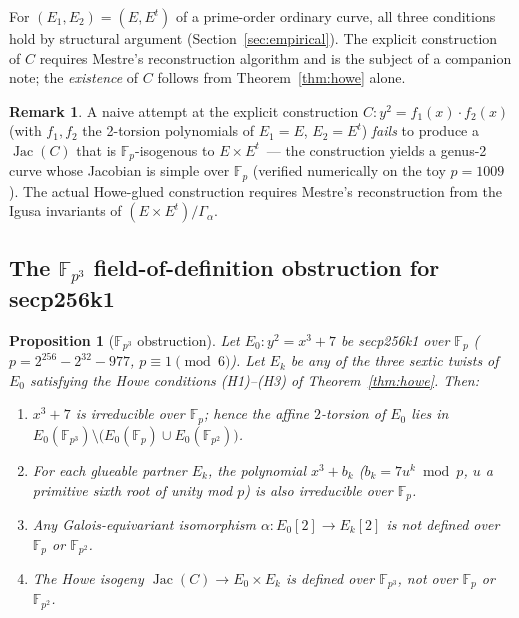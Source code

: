 \documentclass[11pt,a4paper]{article}
\newtheorem{proposition}[theorem]{Proposition}
\theoremstyle{definition}
\newtheorem{remark}[theorem]{Remark}
\newcommand{\FF}{\mathbb{F}}
\newcommand{\Jac}{\operatorname{Jac}}
\begin{document}
For $(E_1, E_2) = (E, E^t)$ of a prime-order ordinary curve, all
three conditions hold by structural argument
(Section~\ref{sec:empirical}). The explicit construction of $C$
requires Mestre's reconstruction algorithm and is the subject of a
companion note; the \emph{existence} of $C$ follows from
Theorem~\ref{thm:howe} alone.

\begin{remark}
A naive attempt at the explicit construction
$C\colon y^2 = f_1(x) \cdot f_2(x)$ (with $f_1, f_2$ the 2-torsion
polynomials of $E_1 = E$, $E_2 = E^t$) \emph{fails} to produce a
$\Jac(C)$ that is $\FF_p$-isogenous to $E \times E^t$~--- the
construction yields a genus-2 curve whose Jacobian is simple over
$\FF_p$ (verified numerically on the toy $p = 1009$). The actual
Howe-glued construction requires Mestre's reconstruction from the
Igusa invariants of $(E \times E^t)/\Gamma_\alpha$.
\end{remark}

\subsection*{The $\FF_{p^3}$ field-of-definition obstruction for secp256k1}

\begin{proposition}[$\FF_{p^3}$ obstruction]\label{prop:fp3obs}
Let $E_0\colon y^2 = x^3 + 7$ be secp256k1 over $\FF_p$
\textup{(}$p = 2^{256} - 2^{32} - 977$, $p \equiv 1 \pmod 6$\textup{)}.
Let $E_k$ be any of the three sextic twists of $E_0$ satisfying the
Howe conditions \textup{(H1)--(H3)} of Theorem~\ref{thm:howe}.  Then:
\begin{enumerate}[label=\textup{(\roman*)}]
\item\label{it:irred} $x^3 + 7$ is irreducible over $\FF_p$; hence the
      affine $2$-torsion of $E_0$ lies in
      $E_0(\FF_{p^3}) \setminus \bigl(E_0(\FF_p) \cup E_0(\FF_{p^2})\bigr)$.
\item\label{it:partner} For each glueable partner $E_k$, the polynomial
      $x^3 + b_k$ \textup{(}$b_k = 7u^k \bmod p$, $u$ a primitive sixth
      root of unity mod $p$\textup{)} is also irreducible over $\FF_p$.
\item\label{it:galois} Any Galois-equivariant isomorphism
      $\alpha\colon E_0[2] \to E_k[2]$ is not defined over $\FF_p$
      or $\FF_{p^2}$.
\item\label{it:cover} The Howe isogeny $\Jac(C) \to E_0 \times E_k$
      is defined over $\FF_{p^3}$, not over $\FF_p$ or $\FF_{p^2}$.
\end{enumerate}
\end{proposition}
\end{document}
